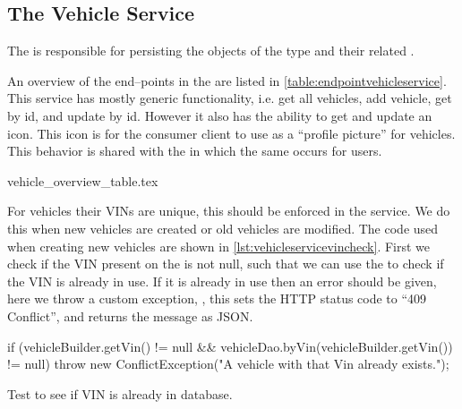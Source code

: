 \subsection{The Vehicle Service}\label{subsec:vehicleservice}

The  is responsible for persisting the objects of the type  and their related .

An overview of the end--points in the  are listed in \cref{table:endpointvehicleservice}.
This service has mostly generic functionality, i.e. get all vehicles, add vehicle, get by id, and update by id.
However it also has the ability to get and update an icon.
This icon is for the consumer client to use as a ``profile picture'' for vehicles.
This behavior is shared with the  in which the same occurs for users.

{vehicle_overview_table.tex}

For vehicles their \acp{VIN} are unique, this should be enforced in the service.
We do this when new vehicles are created or old vehicles are modified.
The code used when creating new vehicles are shown in \cref{lst:vehicleservicevincheck}.
First we check if the \ac{VIN} present on the  is not null,
such that we can use the  to check if the \ac{VIN} is already in use.
If it is already in use then an error should be given, here we throw a custom exception,
, this sets the HTTP status code to ``409 Conflict'', and returns the message as JSON.

\begin{listing}
    \begin{java2}
if (vehicleBuilder.getVin() != null && vehicleDao.byVin(vehicleBuilder.getVin()) != null) {
    throw new ConflictException("A vehicle with that Vin already exists.");
}
    \end{java2}
    \caption{Test to see if VIN is already in database.}\label{lst:vehicleservicevincheck}
\end{listing}
